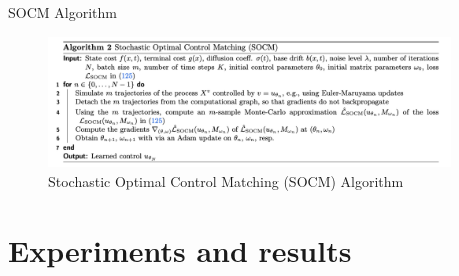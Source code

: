 \documentclass[aspectratio=169,xcolor=dvipsnames]{beamer}
\begin{document}
\begin{frame}{SOCM Algorithm}
    \begin{figure}
        \centering
        \includegraphics[width=0.95\textwidth]{figures/SOCM_algo.png}
        \caption{Stochastic Optimal Control Matching (SOCM) Algorithm}
    \end{figure}
\end{frame}



\section{Experiments and results}
\end{document}
